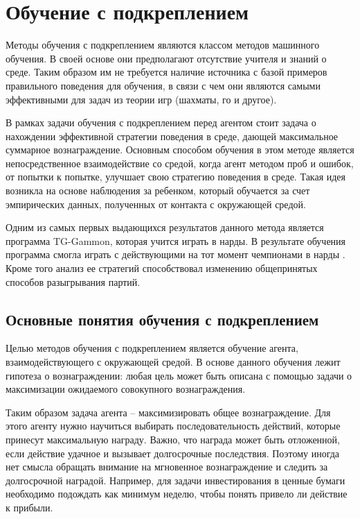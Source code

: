\chapter{Обучение с подкреплением}\label{chap1}

Методы обучения с подкреплением являются классом методов машинного обучения. В своей основе они предполагают отсутствие учителя и знаний о среде. Таким образом им не требуется наличие источника с базой примеров правильного поведения для обучения, в связи с чем они являются самыми эффективными для задач из теории игр (шахматы, го и другое).

В рамках задачи обучения с подкреплением перед агентом стоит задача о нахождении эффективной стратегии поведения в среде, дающей максимальное суммарное вознаграждение. Основным способом обучения  в этом методе является непосредственное взаимодействие со средой, когда агент методом проб и ошибок, от попытки к попытке, улучшает свою стратегию поведения в среде. Такая идея возникла на основе наблюдения за ребенком, который обучается за счет эмпирических данных, полученных от контакта с окружающей средой. 

Одним из самых первых выдающихся результатов данного метода является программа TG-Gammon, которая учится играть в нарды. В результате обучения программа смогла играть с действующими на тот момент чемпионами в нарды \cite{nards}. Кроме того анализ ее стратегий способствовал изменению общепринятых способов разыгрывания партий. 
 
\section{Основные понятия обучения с подкреплением}\label{1sec:optimal-control}

Целью методов обучения с подкреплением является обучение агента,
взаимодействующего с окружающей средой. В основе данного обучения лежит гипотеза о вознаграждении: любая цель может быть описана с помощью задачи о максимизации ожидаемого совокупного вознаграждения.




Таким образом задача агента – максимизировать общее вознаграждение. Для этого агенту нужно научиться выбирать последовательность действий,  которые принесут максимальную награду. Важно, что награда может быть отложенной, если действие удачное и вызывает долгосрочные последствия. Поэтому иногда нет смысла обращать внимание на мгновенное вознаграждение и следить за долгосрочной наградой. Например, для задачи инвестирования в ценные бумаги необходимо подождать как минимум неделю, чтобы понять привело ли действие к прибыли. 

